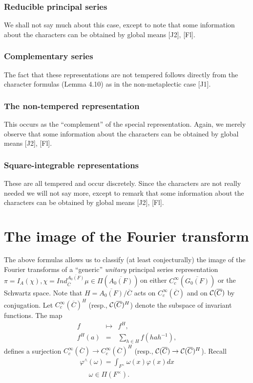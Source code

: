 \subsubsection{Reducible principal series}

We shall not say much about this case, except to note that some information
about the characters can be obtained by global means [J2], [Fl].

\subsubsection{Complementary series}

The fact that these representations are not tempered follows directly from
the character formulas (Lemma 4.10) as in the non-metaplectic case [J1].

\subsubsection{The non-tempered representation}

This occurs as the ``complement'' of the special representation. Again, we
merely observe that some information about the characters can be obtained by
global means [J2], [Fl].

\subsubsection{Square-integrable representations}

These are all tempered and occur discretely. Since the characters are not
really needed we will not say more, except to remark that some information
about the characters can be obtained by global means [J2], [Fl].

\section{The image of the Fourier transform}

The above formulas allows us to classify (at least conjecturally) the image
of the Fourier transforms of a ``generic'' {\em unitary} principal series
representation $\pi =I_A(\chi ),\chi =Ind_{\overline{C}}^{\overline{A_0(F)}%
}\mu \in \Pi (\overline{A_0(F)})\,$on either $C_c^\infty (\overline{G_0(F)})$
or the Schwartz space. Note that $H=\overline{A_0(F)}/\overline{C}$ acts on $%
C_c^\infty (\overline{C})$ and on ${\cal C}(\overline{C})$ by conjugation.
Let $C_c^\infty (\overline{C})^H$ (resp., ${\cal C}(\overline{C})^H$) denote
the subspace of invariant functions. The map 
\begin{eqnarray*}
f &\longmapsto &f^H, \\
f^H(a) &=&\sum_{h\in H}f(hah^{-1}),
\end{eqnarray*}
defines a surjection $C_c^\infty (\overline{C})\rightarrow C_c^\infty (%
\overline{C})^H$ (resp., ${\cal C}(\overline{C})\rightarrow {\cal C}(%
\overline{C})^H$). Recall 
\[
\begin{array}{c}
\varphi ^{\wedge }(\omega )=\int_{F^{\times }}\omega (x)\varphi (x)dx \\ 
\ \ \ \ \ \ \omega \in \Pi (F^{\times }).
\end{array}
\]

